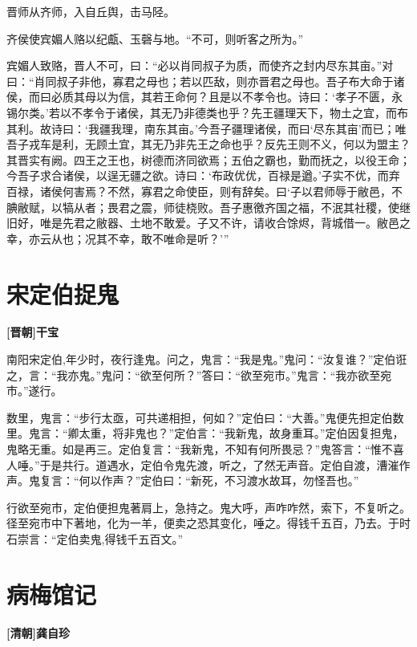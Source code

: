 \documentclass[UTF8,titlepage,oneside]{ctexbook}
\begin{document}
晋师从齐师，入自丘舆，击马陉。


齐侯使宾媚人赂以纪甗、玉磬与地。“不可，则听客之所为。”


宾媚人致赂，晋人不可，曰：“必以肖同叔子为质，而使齐之封内尽东其亩。”对曰：“肖同叔子非他，寡君之母也；若以匹敌，则亦晋君之母也。吾子布大命于诸侯，而曰必质其母以为信，其若王命何？且是以不孝令也。诗曰：‘孝子不匮，永锡尔类。’若以不孝令于诸侯，其无乃非德类也乎？先王疆理天下，物土之宜，而布其利。故诗曰：‘我疆我理，南东其亩。’今吾子疆理诸侯，而曰‘尽东其亩’而已；唯吾子戎车是利，无顾土宜，其无乃非先王之命也乎？反先王则不义，何以为盟主？其晋实有阙。四王之王也，树德而济同欲焉；五伯之霸也，勤而抚之，以役王命；今吾子求合诸侯，以逞无疆之欲。诗曰：‘布政优优，百禄是遒。’子实不优，而弃百禄，诸侯何害焉？不然，寡君之命使臣，则有辞矣。曰‘子以君师辱于敝邑，不腆敝赋，以犒从者；畏君之震，师徒桡败。吾子惠徼齐国之福，不泯其社稷，使继旧好，唯是先君之敝器、土地不敢爱。子又不许，请收合馀烬，背城借一。敝邑之幸，亦云从也；况其不幸，敢不唯命是听？’”



\chapter*{宋定伯捉鬼}
\begin{center}
	\textbf{[晋朝]干宝}
\end{center}


南阳宋定伯,年少时，夜行逢鬼。问之，鬼言：“我是鬼。”鬼问：“汝复谁？”定伯诳之，言：“我亦鬼。”鬼问：“欲至何所？”答曰：“欲至宛市。”鬼言：“我亦欲至宛市。”遂行。


数里，鬼言：“步行太亟，可共递相担，何如？”定伯曰：“大善。”鬼便先担定伯数里。鬼言：“卿太重，将非鬼也？”定伯言：“我新鬼，故身重耳。”定伯因复担鬼，鬼略无重。如是再三。定伯复言：“我新鬼，不知有何所畏忌？”鬼答言：“惟不喜人唾。”于是共行。道遇水，定伯令鬼先渡，听之，了然无声音。定伯自渡，漕漼作声。鬼复言：“何以作声？”定伯曰：“新死，不习渡水故耳，勿怪吾也。”


行欲至宛市，定伯便担鬼著肩上，急持之。鬼大呼，声咋咋然，索下，不复听之。径至宛市中下著地，化为一羊，便卖之恐其变化，唾之。得钱千五百，乃去。于时石崇言：“定伯卖鬼,得钱千五百文。”



\chapter*{病梅馆记}
\begin{center}
	\textbf{[清朝]龚自珍}
\end{center}
\end{document}
